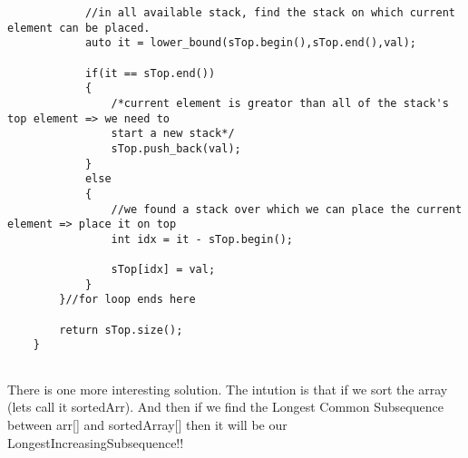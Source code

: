 \begin{solution}
\begin{verbatim}
            //in all available stack, find the stack on which current element can be placed. 
            auto it = lower_bound(sTop.begin(),sTop.end(),val); 

            if(it == sTop.end())
            {
                /*current element is greator than all of the stack's top element => we need to 
                start a new stack*/
                sTop.push_back(val);
            }
            else
            {
                //we found a stack over which we can place the current element => place it on top
                int idx = it - sTop.begin();
            
                sTop[idx] = val; 
            }
        }//for loop ends here
        
        return sTop.size();
    }
    
    \end{verbatim}

\end{solution}

\begin{solution}
    There is one more interesting solution.
    The intution is that if we sort the array (lets call it sortedArr). And then if we find the Longest Common Subsequence
    between arr[] and sortedArray[] then it will be our LongestIncreasingSubsequence!!
\end{solution}

\begin{comment}
\begin{solution}
    Can you build up a recursive soltion with following defination:
    f(idx,\_):= maximum lis length ending at idx. \textbf{(i.e we must include idx)}

    considering that we know the subproblem answer.
    Then at index idx, we have following option:

    
    val1 = f(1) + 1 IF arr[1] < arr[idx]\\
    val2 = f(2) + 1 IF arr[2] < arr[idx]\\
    \dots\\
    $val_j = f(j) + 1 IF arr[j] < arr[idx] (for all j<idx)$

    we will take the best of all the options.

    Now, for f(idx) can you devise recursive relation?

    Code: see the findAnsFour(), some line in recursive solution is not so intutive.

    
\end{solution}
\end{comment}

